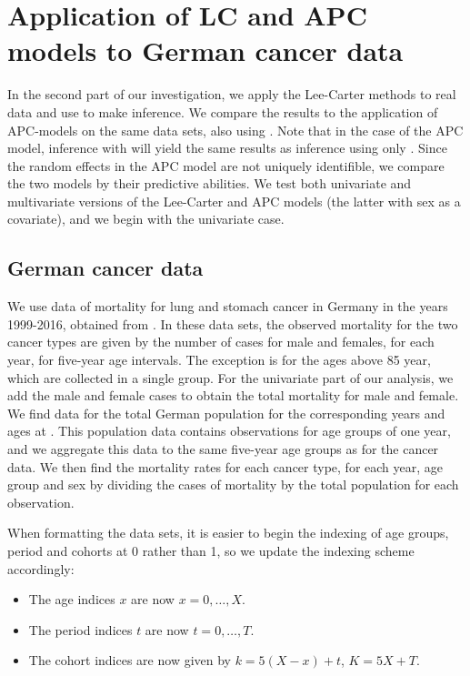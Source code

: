 \newpage
\section{Application of LC and APC models to German cancer data}

In the second part of our investigation, we apply the Lee-Carter methods to real data and use \inlabru to make inference. We compare the results to the application of APC-models on the same data sets, also using \inlabru. Note that in the case of the APC model, inference with \inlabru will yield the same results as inference using only \inla. Since the random effects in the APC model are not uniquely identifible, we compare the two models by their predictive abilities. We test both univariate and multivariate versions of the Lee-Carter and APC models (the latter with sex as a covariate), and we begin with the univariate case. 
\subsection{German cancer data}
\label{sec:GermanCancerData}
We use data of mortality for lung and stomach cancer in Germany in the years 1999-2016, obtained from . In these data sets, the observed mortality for the two cancer types are given by the number of cases for male and females, for each year, for five-year age intervals. The exception is for the ages above 85 year, which are collected in a single group. For the univariate part of our analysis, we add the male and female cases to obtain the total mortality for male and female. We find data for the total German population for the corresponding years and ages at . This population data contains observations for age groups of one year, and we aggregate this data to the same five-year age groups as for the cancer data. We then find the mortality rates for each cancer type, for each year, age group and sex by dividing the cases of mortality by the total population for each observation. 

When formatting the data sets, it is easier to begin the indexing of age groups, period and cohorts at 0 rather than 1, so we update the indexing scheme accordingly:
\begin{itemize}
    \item The age indices $x$ are now $x = 0,\ldots,X$.
    \item The period indices $t$ are now $t = 0, \ldots, T$.
    \item The cohort indices are now given by $k = 5(X - x) + t$, $K = 5X + T$.
\end{itemize}

